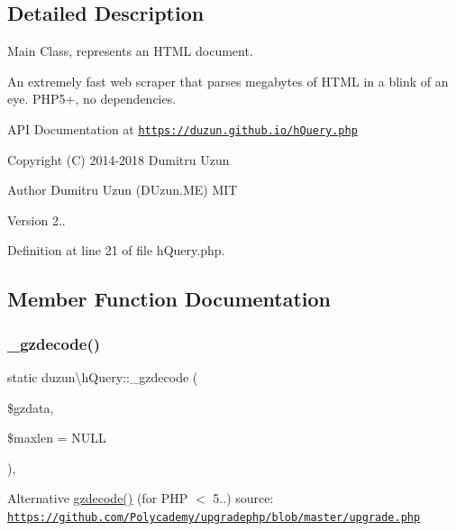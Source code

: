 \subsection{Detailed Description}
Main Class, represents an H\+T\+ML document.

An extremely fast web scraper that parses megabytes of H\+T\+ML in a blink of an eye. P\+H\+P5+, no dependencies.

A\+PI Documentation at \href{https://duzun.github.io/hQuery.php}{\tt https\+://duzun.\+github.\+io/h\+Query.\+php}

Copyright (C) 2014-\/2018 Dumitru Uzun

\begin{DoxyAuthor}{Author}
Dumitru Uzun (D\+Uzun.\+ME)  M\+IT 
\end{DoxyAuthor}
\begin{DoxyVersion}{Version}
2.. 
\end{DoxyVersion}


Definition at line 21 of file h\+Query.\+php.



\subsection{Member Function Documentation}
\mbox{\label{classduzun_1_1hQuery_a91deb0634713a3471cd5101b8b66b579}} 
\subsubsection{\texorpdfstring{\+\_\+gzdecode()}{\_gzdecode()}}
{\footnotesize\ttfamily static duzun\textbackslash{}h\+Query\+::\+\_\+gzdecode (\begin{DoxyParamCaption}\item[{}]{\$gzdata,  }\item[{}]{\$maxlen = {\ttfamily NULL} }\end{DoxyParamCaption})\hspace{0.3cm}{\ttfamily [static]}, {\ttfamily [protected]}}

Alternative \mbox{\hyperlink{classduzun_1_1hQuery_a84f0b53d5a2ae0e695a49f5b0f85c857}{gzdecode()}} (for P\+HP $<$ 5..) source\+: \href{https://github.com/Polycademy/upgradephp/blob/master/upgrade.php}{\tt https\+://github.\+com/\+Polycademy/upgradephp/blob/master/upgrade.\+php} 

